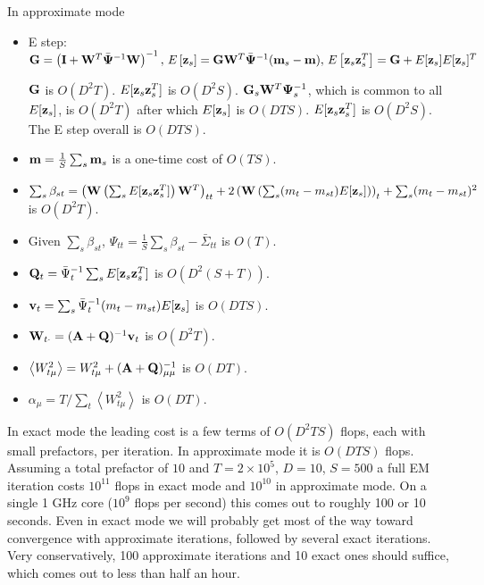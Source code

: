 \documentclass[nofootinbib,amssymb,amsmath]{revtex4}
\newcommand{\ave}[1]{\left\langle #1 \right\rangle}
\newcommand{\vI}{{\bf I}}
\newcommand{\vv}{{\bf v}}
\newcommand{\vz}{{\bf z}}
\newcommand{\vm}{{\bf m}}
\newcommand{\vG}{{\bf G}}
\newcommand{\vQ}{{\bf Q}}
\newcommand{\vW}{{\bf W}}
\newcommand{\vPsi}{{\bf \Psi}}
\newcommand{\vA}{{\bf A}}
\begin{document}
In approximate mode
\begin{itemize}
\item E step: $\vG = \left( \vI + \vW^T \bar{\vPsi}^{-1} \vW \right)^{-1}, \,
E \left[ \vz_s \right] = \vG \vW^T \bar{\vPsi}^{-1} (\vm_s - \vm), \,
E \left[ \vz_s \vz_s^T \right] = \vG + E[\vz_s] E[\vz_s]^T$

$\vG$ is $O(D^2 T)$.  $E[\vz_s \vz_s^T]$ is $O(D^2 S)$.  $\vG_s \vW^T \vPsi_s^{-1}$, which is common to all $E[\vz_s]$, is $O(D^2 T)$ after which $E[\vz_s]$ is $O(D T S)$.  $E[\vz_s \vz_s^T]$ is $O(D^2 S)$.  The E step overall is $O(D T S)$.

\item $\vm = \frac{1}{S} \sum_s \vm_s$ is a one-time cost of $O(T S)$.

\item $\sum_s \beta_{st} =\left( \vW \left( \sum_s E[\vz_s \vz_s^T] \right) \vW^T \right)_{tt} +2 \left( \vW \left( \sum_s (m_t - m_{st}) E[\vz_s] \right) \right)_t + \sum_s (m_t - m_{st})^2$ is $O(D^2 T)$.

\item Given $\sum_s \beta_{st}$, $\Psi_{tt} = \frac{1}{S} \sum_s \beta_{st} - \bar{\Sigma}_{tt}$ is $O(T)$.

\item $\vQ_t =  \bar{\Psi}_{t}^{-1} \sum_s E[\vz_s \vz_s^T]$ is $O(D^2 (S + T))$.

\item $\vv_t = \sum_s \bar{\Psi}_{t}^{-1} (m_t - m_{st})E[\vz_s ]$ is $O(D T S)$.

\item $ \vW_{t \cdot} = (\vA + \vQ)^{-1} \vv_t$ is $O(D^2 T)$.

\item $\ave{W_{t\mu}^2} = W_{t\mu}^2 + (\vA + \vQ)^{-1}_{\mu\mu}$ is $O(D T)$.

\item $\alpha_\mu = T / \sum_t \ave{W_{t\mu}^2}$ is $O(D T)$.
\end{itemize}

In exact mode the leading cost is a few terms of $O(D^2 T S)$ flops, each with small prefactors, per iteration.  In approximate mode it is $O(D T S)$ flops.  Assuming a total prefactor of $10$ and $T = 2 \times 10^5$, $D = 10$, $S = 500$ a full EM iteration costs $10^{11}$ flops in exact mode and $10^{10}$ in approximate mode.  On a single 1 GHz core ($10^9$ flops per second) this comes out to roughly 100 or 10 seconds.  Even in exact mode we will probably get most of the way toward convergence with approximate iterations, followed by several exact iterations.  Very conservatively, 100 approximate iterations and 10 exact ones should suffice, which comes out to less than half an hour.
\end{document}
